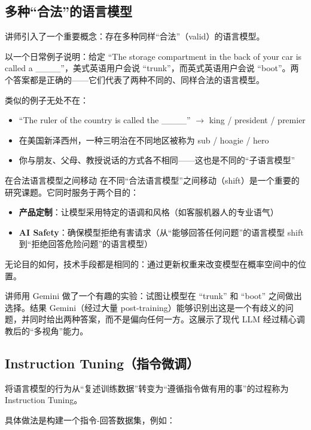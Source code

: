 \subsection{多种``合法''的语言模型}

讲师引入了一个重要概念：存在多种同样``合法''（valid）的语言模型。

以一个日常例子说明：给定 ``The storage compartment in the back of your car is called a \_\_\_\_''，美式英语用户会说 ``trunk''，而英式英语用户会说 ``boot''。两个答案都是正确的——它们代表了两种不同的、同样合法的语言模型。

类似的例子无处不在：
\begin{itemize}
    \item ``The ruler of the country is called the \_\_\_\_'' $\rightarrow$ king / president / premier
    \item 在美国新泽西州，一种三明治在不同地区被称为 sub / hoagie / hero
    \item 你与朋友、父母、教授说话的方式各不相同——这也是不同的``子语言模型''
\end{itemize}

\begin{knowledgebox}{在合法语言模型之间移动}
在不同``合法语言模型''之间移动（shift）是一个重要的研究课题。它同时服务于两个目的：
\begin{itemize}
    \item \textbf{产品定制}：让模型采用特定的语调和风格（如客服机器人的专业语气）
    \item \textbf{AI Safety}：确保模型拒绝有害请求（从``能够回答任何问题''的语言模型 shift 到``拒绝回答危险问题''的语言模型）
\end{itemize}
无论目的如何，技术手段都是相同的：通过更新权重来改变模型在概率空间中的位置。
\end{knowledgebox}

讲师用 Gemini 做了一个有趣的实验：试图让模型在 ``trunk'' 和 ``boot'' 之间做出选择。结果 Gemini（经过大量 post-training）能够识别出这是一个有歧义的问题，并同时给出两种答案，而不是偏向任何一方。这展示了现代 LLM 经过精心调教后的``多视角''能力。

\subsection{Instruction Tuning（指令微调）}

将语言模型的行为从``复述训练数据''转变为``遵循指令做有用的事''的过程称为 Instruction Tuning。

具体做法是构建一个指令-回答数据集，例如：

